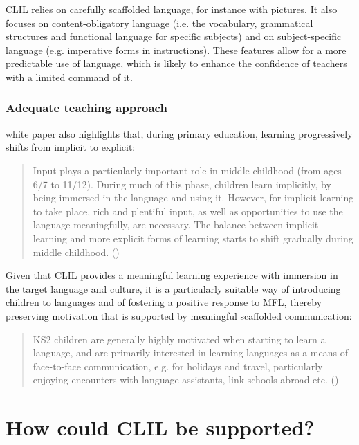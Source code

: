 \documentclass[output=paper]{langscibook}
\begin{document}
CLIL relies on carefully scaffolded language, for instance with pictures. It also focuses on content-obligatory language (i.e. the vocabulary, grammatical structures and functional language for specific subjects) and on subject-specific language (e.g. imperative forms in instructions). These features allow for a more predictable use of language, which is likely to enhance the confidence of teachers with a limited command of it.

\subsubsection{Adequate teaching approach}

 white paper also highlights that, during primary education, learning progressively shifts from implicit to explicit:

\begin{quote}
Input plays a particularly important role in middle childhood (from ages 6/7 to 11/12). During much of this phase, children learn implicitly, by being immersed in the language and using it. However, for implicit learning to take place, rich and plentiful input, as well as opportunities to use the language meaningfully, are necessary. The balance between implicit learning and more explicit forms of learning starts to shift gradually during middle childhood. (\citealt[10]{HolmesMyles2019})
\end{quote}

Given that CLIL provides a meaningful learning experience with immersion in the target language and culture, it is a particularly suitable way of introducing children to languages and of fostering a positive response to MFL, thereby preserving motivation that is supported by meaningful scaffolded communication:

\begin{quote}
KS2 children are generally highly motivated when starting to learn a language, and are primarily interested in learning languages as a means of face-to-face communication, e.g. for holidays and travel, particularly enjoying encounters with language assistants, link schools abroad etc. (\citealt[11]{HolmesMyles2019})
\end{quote}

\section{How could CLIL be supported?}
\end{document}
